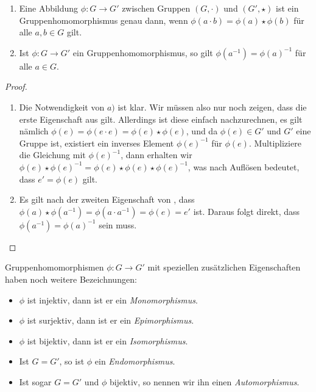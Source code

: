 {\begin{lemma}
  \leavevmode \vspace{-\baselineskip}
  \begin{enumerate}[label=\alph*)]
    \item Eine Abbildung $\phi \colon G \rightarrow G'$ zwischen Gruppen $(G,\cdot)$ und $(G',\star)$ ist ein Gruppenhomomorphismus genau dann, wenn $\phi(a \cdot b) = \phi(a) \star \phi(b)$ für alle $a,b \in G$ gilt.
    \item Ist $\phi \colon G \rightarrow G'$ ein Gruppenhomomorphismus, so gilt $\phi(a^{-1})=\phi(a)^{-1}$ für alle $a \in G$.
  \end{enumerate}
\end{lemma}

\begin{proof}
  \begin{enumerate}[label=\alph*)]
    \item Die Notwendigkeit von $a)$ ist klar. Wir müssen also nur noch zeigen, dass die erste Eigenschaft aus  gilt. Allerdings ist diese einfach nachzurechnen, es gilt nämlich $\phi(e) = \phi(e \cdot e) = \phi(e) \star \phi(e)$, und da $\phi(e) \in G'$ und $G'$ eine Gruppe ist, existiert ein inverses Element $\phi(e)^{-1}$ für $\phi(e)$.
    Multipliziere die Gleichung mit $\phi(e)^{-1}$, dann erhalten wir $\phi(e) \star \phi(e)^{-1} = \phi(e) \star \phi(e) \star \phi(e)^{-1}$, was nach Auflösen bedeutet, dass $e' = \phi(e)$ gilt.
    \item Es gilt nach der zweiten Eigenschaft von , dass $\phi(a) \star \phi(a^{-1}) = \phi(a \cdot a^{-1}) = \phi(e) = e'$ ist. Daraus folgt direkt, dass $\phi(a^{-1}) = \phi(a)^{-1}$ sein muss.
  \end{enumerate}
\end{proof}

Gruppenhomomorphismen $\phi \colon G \rightarrow G'$ mit speziellen zusätzlichen Eigenschaften haben noch weitere Bezeichnungen:
\begin{itemize}
  \item $\phi$ ist injektiv, dann ist er ein \emph{Monomorphismus}.
  \item $\phi$ ist surjektiv, dann ist er ein \emph{Epimorphismus}.
  \item $\phi$ ist bijektiv, dann ist er ein \emph{Isomorphismus}.
  \item Ist $G = G'$, so ist $\phi$ ein \emph{Endomorphismus}.
  \item Ist sogar $G = G'$ und $\phi$ bijektiv, so nennen wir ihn einen \emph{Automorphismus}.
\end{itemize}

}

